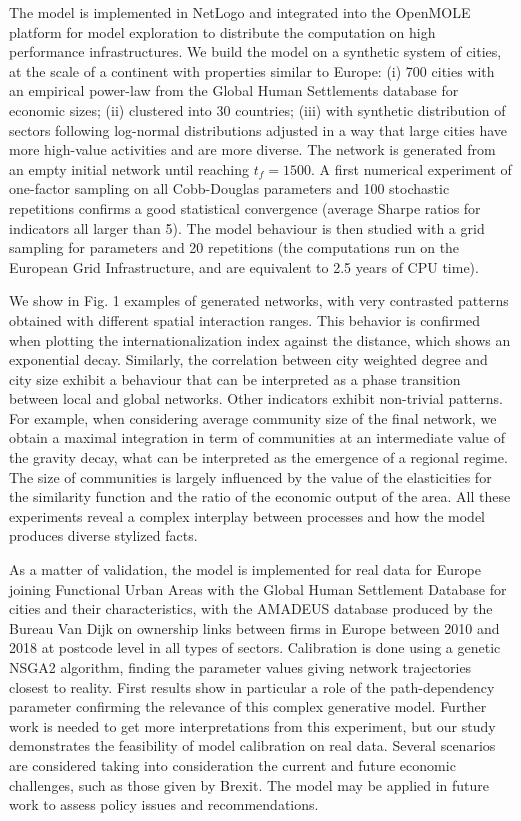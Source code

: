 \documentclass[10pt,letterpaper]{article}
\begin{document}
The model is implemented in NetLogo and integrated into the OpenMOLE platform for model exploration to distribute the computation on high performance infrastructures. We build the model on a synthetic system of cities, at the scale of a continent with properties similar to Europe: (i) 700 cities with an empirical power-law from the Global Human Settlements database for economic sizes; (ii) clustered into 30 countries; (iii) with synthetic distribution of sectors following log-normal distributions adjusted in a way that large cities have more high-value activities and are more diverse. The network is generated from an empty initial network until reaching $t_f=1500$. A first numerical experiment of one-factor sampling on all Cobb-Douglas parameters and 100 stochastic repetitions confirms a good statistical convergence (average Sharpe ratios for indicators all larger than 5). The model behaviour is then studied with a grid sampling for parameters and 20 repetitions (the computations run on the European Grid Infrastructure, and are equivalent to 2.5 years of CPU time).

We show in Fig. 1 examples of generated networks, with very contrasted patterns obtained with different spatial interaction ranges. This behavior is confirmed when plotting the internationalization index against the distance, which shows an exponential decay. Similarly, the correlation between city weighted degree and city size exhibit a behaviour that can be interpreted as a phase transition between local and global networks. Other indicators exhibit non-trivial patterns. For example, when considering average community size of the final network, we obtain a maximal integration in term of communities at an intermediate value of the gravity decay, what can be interpreted as the emergence of a regional regime. The size of communities is largely influenced by the value of the elasticities for the similarity function and the ratio of the economic output of the area. All these experiments reveal a complex interplay between processes and how the model produces diverse stylized facts.

As a matter of validation, the model is implemented for real data for Europe joining Functional Urban Areas with the Global Human Settlement Database for cities and their characteristics, with the AMADEUS database produced by the Bureau Van Dijk on ownership links between firms in Europe between 2010 and 2018 at postcode level in all types of sectors. Calibration is done using a genetic NSGA2 algorithm, finding the parameter values giving network trajectories closest to reality. First results show in particular a role of the path-dependency parameter confirming the relevance of this complex generative model. Further work is needed to get more interpretations from this experiment, but our study demonstrates the feasibility of model calibration on real data. Several scenarios are considered taking into consideration the current and future economic challenges, such as those given by Brexit. The model may be applied in future work to assess policy issues and recommendations.
\end{document}
